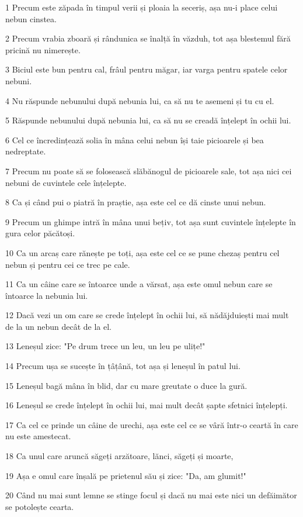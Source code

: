 \par 1 Precum este zăpada în timpul verii și ploaia la seceriș, așa nu-i place celui nebun cinstea.
\par 2 Precum vrabia zboară și rândunica se înalță în văzduh, tot așa blestemul fără pricină nu nimerește.
\par 3 Biciul este bun pentru cal, frâul pentru măgar, iar varga pentru spatele celor nebuni.
\par 4 Nu răspunde nebunului după nebunia lui, ca să nu te asemeni și tu cu el.
\par 5 Răspunde nebunului după nebunia lui, ca să nu se creadă înțelept în ochii lui.
\par 6 Cel ce încredințează solia în mâna celui nebun își taie picioarele și bea nedreptate.
\par 7 Precum nu poate să se folosească slăbănogul de picioarele sale, tot așa nici cei nebuni de cuvintele cele înțelepte.
\par 8 Ca și când pui o piatră în praștie, așa este cel ce dă cinste unui nebun.
\par 9 Precum un ghimpe intră în mâna unui bețiv, tot așa sunt cuvintele înțelepte în gura celor păcătoși.
\par 10 Ca un arcaș care rănește pe toți, așa este cel ce se pune chezaș pentru cel nebun și pentru cei ce trec pe cale.
\par 11 Ca un câine care se întoarce unde a vărsat, așa este omul nebun care se întoarce la nebunia lui.
\par 12 Dacă vezi un om care se crede înțelept în ochii lui, să nădăjduiești mai mult de la un nebun decât de la el.
\par 13 Leneșul zice: "Pe drum trece un leu, un leu pe ulițe!"
\par 14 Precum ușa se sucește în țâțână, tot așa și leneșul în patul lui.
\par 15 Leneșul bagă mâna în blid, dar cu mare greutate o duce la gură.
\par 16 Leneșul se crede înțelept în ochii lui, mai mult decât șapte sfetnici înțelepți.
\par 17 Ca cel ce prinde un câine de urechi, așa este cel ce se vâră într-o ceartă în care nu este amestecat.
\par 18 Ca unul care aruncă săgeți arzătoare, lănci, săgeți și moarte,
\par 19 Așa e omul care înșală pe prietenul său și zice: "Da, am glumit!"
\par 20 Când nu mai sunt lemne se stinge focul și dacă nu mai este nici un defăimător se potolește cearta.
